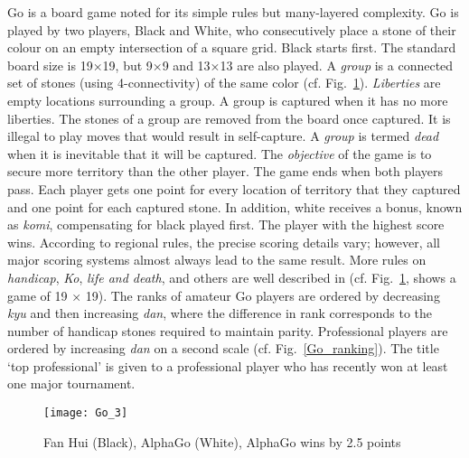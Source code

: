 Go is a board game noted for its simple rules but many-layered complexity. Go is played by two players, Black and White, who consecutively place a stone of their colour on an empty intersection of a square grid. Black starts first. The standard board size is 19×19, but 9×9 and 13×13 are also played. A \textit{group} is a connected set of stones (using 4-connectivity) of the same color (cf. Fig.~\ref{Go_1}). \textit{Liberties} are empty locations surrounding a group. A group is captured when it has no more liberties. The stones of a group are removed from the board once captured. It is illegal to play moves that would result in self-capture. A \textit{group} is termed \textit{dead} when it is inevitable that it will be captured. The \textit{objective} of the game is to secure more territory than the other player. The game ends when both players pass. Each player gets one point for every location of territory that they captured and one point for each captured stone. In addition, white receives a bonus, known as \textit{komi}, compensating for black played first. The player with the highest score wins. According to regional rules, the precise scoring details vary; however, all major scoring systems almost always lead to the same result. More rules on \textit{handicap}, \textit{Ko}, \textit{life and death}, and others are well described in\cite{b11,b14,b15} (cf. Fig.~\ref{Go_1}, shows a game of 19 × 19).
The ranks of amateur Go players are ordered by decreasing \textit{kyu} and then increasing \textit{dan}, where the difference in rank corresponds to the number of handicap stones required to maintain parity. Professional players are ordered by increasing \textit{dan} on a second scale (cf. Fig.~\ref{Go_ranking}). The title `top professional' is given to a professional player who has recently won at least one major tournament.
\begin{figure}[b]
    \centering
    \texttt{[image: Go\_3]}
    \caption{Fan Hui (Black), AlphaGo (White), AlphaGo wins by 2.5 points\cite{b12}}
    \label{Go_1}
\end{figure}

